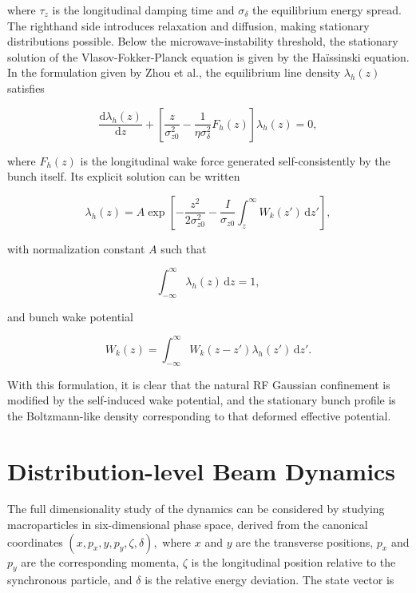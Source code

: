 where \(\tau_{z}\) is the longitudinal damping time and \(\sigma_{\delta}\) the equilibrium energy spread. The righthand side introduces relaxation and diffusion, making stationary distributions possible. Below the microwave-instability threshold, the stationary solution of the Vlasov-Fokker-Planck equation is given by the Haïssinski equation. In the formulation given by Zhou et al.\cite{zhou2023haissinski}, the equilibrium line density \(\lambda_{h} ( z )\) satisfies

\begin{equation}
\label{eq:21}
\frac{\mathrm{d}\lambda_h(z)}{\mathrm{d}z}+\left[\frac{z}{\sigma_{z0}^2}-\frac{1}{\eta\sigma_{\delta}^2}F_h(z)\right]\lambda_h(z)=0,
\end{equation}

where \(F_{h} ( z )\) is the longitudinal wake force generated self-consistently by the bunch itself. Its explicit solution can be written

\begin{equation}
\label{eq:22}
\lambda_h(z)=A\exp\left[-\frac{z^2}{2\sigma_{z0}^2}-\frac{I}{\sigma_{z0}}\int_z^{\infty}W_k(z')\,\mathrm{d}z'\right],
\end{equation}

with normalization constant \(A\) such that

\begin{equation}
\label{eq:23}
\int_{-\infty}^{\infty}\lambda_h(z)\,\mathrm{d}z=1,
\end{equation}

and bunch wake potential

\begin{equation}
\label{eq:24}
W_k(z)=\int_{-\infty}^{\infty}W_k(z-z')\lambda_h(z')\,\mathrm{d}z'.
\end{equation}

With this formulation, it is clear that the natural RF Gaussian confinement is modified by the self-induced wake potential, and the stationary bunch profile is the Boltzmann-like density corresponding to that deformed effective potential.

\section{Distribution-level Beam Dynamics}
\label{sec:02_beam_dynamics_distribution_level_beam_dynamics}

The full dimensionality study of the dynamics can be considered by studying macroparticles in six-dimensional phase space, derived from the canonical coordinates \(( x , p_{x} , y , p_{y} , \zeta , \delta ) ,\) where \(x\) and \(y\) are the transverse positions, \(p_{x}\) and \(p_{y}\) are the corresponding momenta, \(\zeta\) is the longitudinal position relative to the synchronous particle, and \(\delta\) is the relative energy deviation. The state vector is

